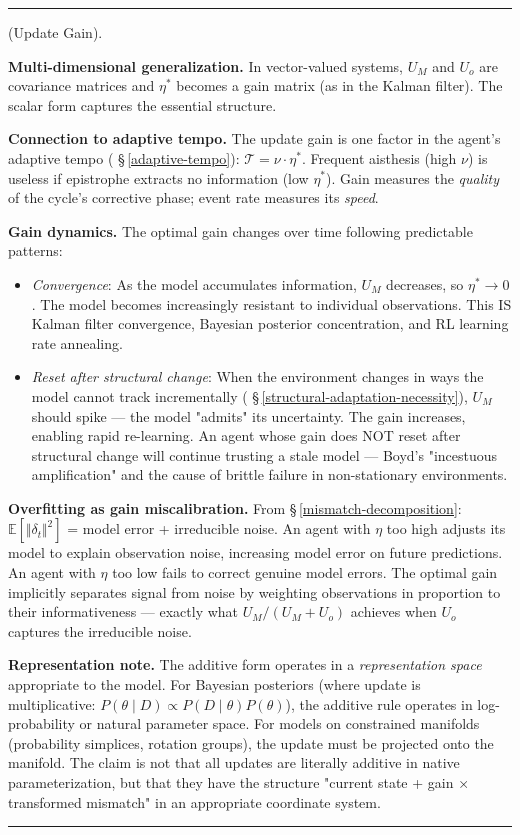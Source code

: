 \documentclass[11pt,oneside]{article}
\newcounter{claim}[section]
\renewcommand{\theclaim}{\thesection.\arabic{claim}}
\newenvironment{segment}[2]{%
  \refstepcounter{claim}%
  \bigskip\noindent\hrule\smallskip
  \noindent{\bfseries #1~\theclaim}\enskip(#2).\par\smallskip
  \noindent\ignorespaces
}{%
  \par\smallskip\noindent\hrule\bigskip
}
\newenvironment{empirical}[1][]{\begin{segment}{Empirical}{#1}}{\end{segment}}
\begin{document}
\begin{empirical}[Update Gain]
\textbf{Multi-dimensional generalization.} In vector-valued systems, $U_M$ and $U_o$ are covariance matrices and $\eta^*$ becomes a gain matrix (as in the Kalman filter). The scalar form captures the essential structure.

\textbf{Connection to adaptive tempo.} The update gain is one factor in the agent's adaptive tempo ( \S\,\ref{adaptive-tempo}): $\mathcal{T} = \nu \cdot \eta^*$. Frequent aisthesis (high $\nu$) is useless if epistrophe extracts no information (low $\eta^*$). Gain measures the \textit{quality} of the cycle's corrective phase; event rate measures its \textit{speed}.

\textbf{Gain dynamics.} The optimal gain changes over time following predictable patterns:

\begin{itemize}
  \item \textit{Convergence}: As the model accumulates information, $U_M$ decreases, so $\eta^* \to 0$. The model becomes increasingly resistant to individual observations. This IS Kalman filter convergence, Bayesian posterior concentration, and RL learning rate annealing.
  \item \textit{Reset after structural change}: When the environment changes in ways the model cannot track incrementally ( \S\,\ref{structural-adaptation-necessity}), $U_M$ should spike — the model "admits" its uncertainty. The gain increases, enabling rapid re-learning. An agent whose gain does NOT reset after structural change will continue trusting a stale model — Boyd's "incestuous amplification" and the cause of brittle failure in non-stationary environments.
\end{itemize}


\textbf{Overfitting as gain miscalibration.} From \S\,\ref{mismatch-decomposition}: $\mathbb{E}[\Vert\delta_t\Vert^2]$ = model error + irreducible noise. An agent with $\eta$ too high adjusts its model to explain observation noise, increasing model error on future predictions. An agent with $\eta$ too low fails to correct genuine model errors. The optimal gain implicitly separates signal from noise by weighting observations in proportion to their informativeness — exactly what $U_M/(U_M + U_o)$ achieves when $U_o$ captures the irreducible noise.

\textbf{Representation note.} The additive form operates in a \textit{representation space} appropriate to the model. For Bayesian posteriors (where update is multiplicative: $P(\theta \mid D) \propto P(D \mid \theta) P(\theta)$), the additive rule operates in log-probability or natural parameter space. For models on constrained manifolds (probability simplices, rotation groups), the update must be projected onto the manifold. The claim is not that all updates are literally additive in native parameterization, but that they have the structure "current state + gain × transformed mismatch" in an appropriate coordinate system.


\end{empirical}
\end{document}
